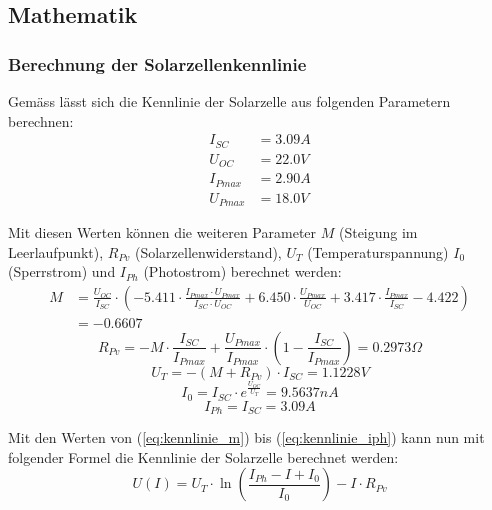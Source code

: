 \subsection{Mathematik}

\subsubsection{Berechnung der Solarzellenkennlinie}

Gemäss \cite{photovoltaik_engineering} lässt sich die Kennlinie der Solarzelle aus folgenden Parametern berechnen:
\begin{align*}
	I_{SC} &= 3.09A \\
	U_{OC} &= 22.0V \\
	I_{Pmax} &= 2.90A \\
	U_{Pmax} &= 18.0V
\label{eq:eingangsparameter_kennlinie}
\end{align*}

Mit diesen Werten können die weiteren Parameter $M$ (Steigung im Leerlaufpunkt), $R_{Pv}$ (Solarzellenwiderstand), $U_T$ (Temperaturspannung) $I_0$ (Sperrstrom) und $I_{Ph}$ (Photostrom) berechnet werden:
\begin{equation}\begin{split}
	M&=\frac{U_{OC}}{I_{SC}}\cdot\left(-5.411\cdot\frac{I_{Pmax}\cdot U_{Pmax}}{I_{SC}\cdot U_{OC}}+6.450\cdot\frac{U_{Pmax}}{U_{OC}}+3.417\cdot\frac{I_{Pmax}}{I_{SC}}-4.422\right) \\
	&=-0.6607
\label{eq:kennlinie_m}
\end{split}\end{equation}
\begin{equation}
	R_{Pv}=-M\cdot\frac{I_{SC}}{I_{Pmax}}+\frac{U_{Pmax}}{I_{Pmax}}\cdot\left(1-\frac{I_{SC}}{I_{Pmax}}\right)=0.2973\Omega
\label{eq:kennlinie_rpv}
\end{equation}
\begin{equation}
	U_T=-\left(M+R_{Pv}\right)\cdot I_{SC}=1.1228V
\label{eq:kennlinie_ut}
\end{equation}
\begin{equation}
	I_0=I_{SC}\cdot e^{\frac{U_{OC}}{U_T}}=9.5637nA
\label{eq:}
\end{equation}
\begin{equation}
	I_{Ph}=I_{SC}=3.09A
\label{eq:kennlinie_iph}
\end{equation}

Mit den Werten von (\ref{eq:kennlinie_m}) bis (\ref{eq:kennlinie_iph}) kann nun mit folgender Formel die Kennlinie der Solarzelle berechnet werden:
\begin{equation}
	U\left(I\right)=U_T\cdot\ln\left(\frac{I_{Ph}-I+I_0}{I_0}\right)-I\cdot R_{Pv}
\label{eq:kennlinie}
\end{equation}

